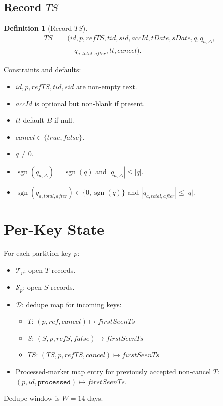 \documentclass[sigconf]{acmart}
\newtheorem{definition}{Definition}
\begin{document}
\subsection{Record $TS$}
\begin{definition}[Record $TS$]
\[
\begin{aligned}
TS={}&(id,p,refTS,tid,sid,accId,tDate,sDate,q,q_{a,\Delta},\\
&\quad q_{a,total,after},tt,cancel).
\end{aligned}
\]
\end{definition}

Constraints and defaults:
\begin{itemize}[leftmargin=*]
  \item $id,p,refTS,tid,sid$ are non-empty text.
  \item $accId$ is optional but non-blank if present.
  \item $tt$ default $B$ if null.
  \item $cancel\in\{true,false\}$.
  \item $q\neq 0$.
  \item $\operatorname{sgn}(q_{a,\Delta})=\operatorname{sgn}(q)$ and $|q_{a,\Delta}|\le |q|$.
  \item $\operatorname{sgn}(q_{a,total,after})\in\{0,\operatorname{sgn}(q)\}$ and $|q_{a,total,after}|\le |q|$.
\end{itemize}

\section{Per-Key State}
For each partition key $p$:
\begin{itemize}[leftmargin=*]
  \item $\mathcal{T}_p$: open $T$ records.
  \item $\mathcal{S}_p$: open $S$ records.
  \item $\mathcal{D}$: dedupe map for incoming keys:
  \begin{itemize}[leftmargin=*]
    \item $T$: $(p,ref,cancel)\mapsto firstSeenTs$
    \item $S$: $(S,p,refS,false)\mapsto firstSeenTs$
    \item $TS$: $(TS,p,refTS,cancel)\mapsto firstSeenTs$
  \end{itemize}
  \item Processed-marker map entry for previously accepted non-cancel $T$: $(p,id,\texttt{processed})\mapsto firstSeenTs$.
\end{itemize}
Dedupe window is $W=14$ days.
\end{document}
